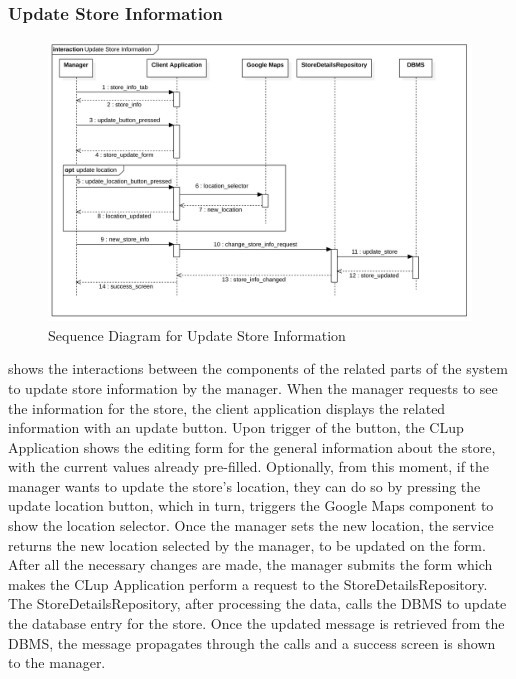 \subsubsection{Update Store Information}
\begin{figure}[H]
    \centering
    \includegraphics[height=0.4\textwidth]{Images/SequenceDiagrams/UpdateStoreInformation.png}
    \caption{Sequence Diagram for Update Store Information}
    \label{fig:SDUpdateStoreInformation}
\end{figure}
 shows the interactions between the components of the related parts of the system to update store information by the manager.
When the manager requests to see the information for the store, the client application displays the related information with an update button.
Upon trigger of the button, the CLup Application shows the editing form for the general information about the store, with the current values already pre-filled.
Optionally, from this moment, if the manager wants to update the store's location, they can do so by pressing the update location button, which in turn, triggers the Google Maps component to show the location selector.
Once the manager sets the new location, the service returns the new location selected by the manager, to be updated on the form.
After all the necessary changes are made, the manager submits the form which makes the CLup Application perform a request to the StoreDetailsRepository.
The StoreDetailsRepository, after processing the data, calls the DBMS to update the database entry for the store.
Once the updated message is retrieved from the DBMS, the message propagates through the calls and a success screen is shown to the manager.
